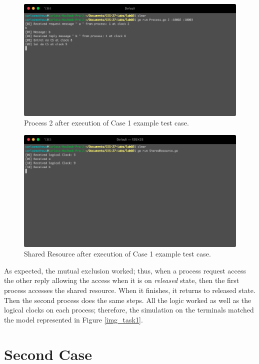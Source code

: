 \documentclass[a4paper, 11pt]{article}
\begin{document}
\begin{figure}[h]
  \begin{center}
  \includegraphics[width=4.5in]{./imgs/case1process2.png}
  \caption{Process 2 after execution of Case 1 example test case.}
  \label{img_task1_example_window2}
  \end{center}
\end{figure}

\begin{figure}[h]
  \begin{center}
  \includegraphics[width=4.5in]{./imgs/case1CS.png}
  \caption{Shared Resource after execution of Case 1 example test case.}
  \label{img_task1_example_window3}
  \end{center}
\end{figure}

As expected, the mutual exclusion worked; thus, when a process request access the other reply allowing the access when it is on \textit{released} state, then the first process accesses the shared resource. When it finishes, it returns to released state. Then the second process does the same steps. All the logic worked as well as the logical clocks on each process; therefore, the simulation on the terminals matched the model represented in Figure \ref{img_task1}.

\section*{Second Case}
\end{document}
